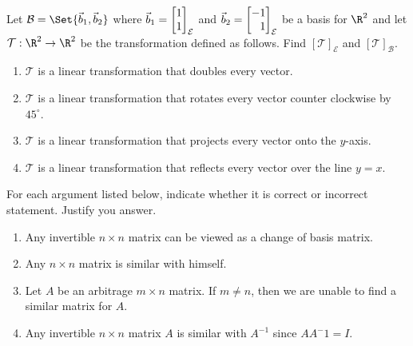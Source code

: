 \begin{exercises}
\begin{problist}
	    \prob Let $\mathcal B=\Set{\vec b_1,\vec b_2}$ where $\vec b_1=\mat{1\\1}_{\mathcal E}$ and $\vec b_2=\mat{-1\\1}_{\mathcal E}$ be a basis for $\R^2$ and let $\mathcal T:\R^2\to\R^2$ be the transformation defined as follows. Find $[\mathcal T]_{\mathcal E}$ and $[\mathcal T]_{\mathcal B}$.
	        \begin{enumerate}
	            \item   $\mathcal T$ is a linear transformation that doubles every vector.
			    \item   $\mathcal T$ is a linear transformation that rotates every vector counter clockwise by $45^\circ$.
			    \item   $\mathcal T$ is a linear transformation that projects every vector onto the $y$-axis.
			    \item   $\mathcal T$ is a linear transformation that reflects every vector over the line $y=x$.
	        \end{enumerate}
        
        \prob For each argument listed below, indicate whether it is correct or incorrect statement. Justify you answer.
        \begin{enumerate}
            \item   Any invertible $n \times n$ matrix can be viewed as a change of basis matrix.
            \item   Any $n \times n$ matrix is similar with himself.
            \item   Let $A$ be an arbitrage $m \times n$ matrix. If $m \neq n$, then we are unable to find a similar matrix for $A$.
            \item   Any invertible $n \times n$ matrix $A$ is similar with $A^{-1}$ since $AA^-1=I$.
        \end{enumerate}
	\end{problist}
\end{exercises}
